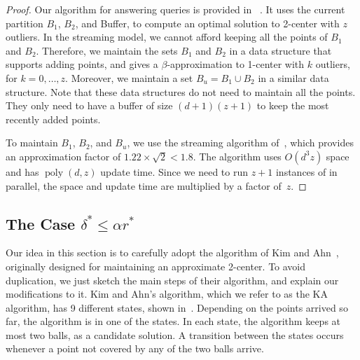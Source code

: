 \documentclass[envcountsame]{cls/cccg15}
\newcommand{\dz}{(d + 1)(z + 1)}
\newcommand{\poly}{\mathop{\mathrm{poly}}}
\newcommand{\lee}{\leqslant}
\renewcommand{\leq}{\lee}
\begin{document}
\begin{proof}
Our algorithm for answering queries is provided in ~.
It uses the current partition $B_1$, $B_2$, and Buffer, to compute
an optimal solution to 2-center with $z$ outliers.
In the streaming model, we cannot afford keeping all the points of $B_1$ and $B_2$. 
Therefore, we maintain the sets $B_1$ and $B_2$ 
in a data structure that supports adding points,
and gives a $\beta$-approximation to 1-center with $k$ outliers, for $k=0,\dots,z$.
Moreover, we maintain a set $B_u = B_1 \cup B_2$ in a similar data structure.
Note that these data structures do not need to maintain all the points. 
They only need to have a buffer of size $\dz$ to keep the most recently added points.

To maintain $B_1$, $B_2$, and $B_u$, we 
use the streaming algorithm of~\cite{zarrabi2009streaming,chan2014streaming},
which provides an approximation factor of $1.22 \times \sqrt{2} <1.8$.
The algorithm uses $O(d^3z)$ space and has $\poly(d,z)$ update time.
Since we need to run $z + 1$ instances of  in parallel, 
the space and update time are multiplied by a factor of~$z$.
\end{proof}



\subsection{The Case $\delta^* \leq \alpha r^*$}
\label{subsec:smaller}

Our idea in this section is to carefully adopt
the algorithm of Kim and Ahn~\cite{kim2014improved},
originally designed for maintaining an approximate 2-center.
To avoid duplication, we just sketch the main steps of their algorithm,
and explain our modifications to it. 
Kim and Ahn's algorithm, which we refer to as the KA algorithm,
has 9 different states, shown in~.
Depending on the points arrived so far, the algorithm is in one of the states.
In each state, the algorithm keeps at most two balls, as a candidate solution. 
A transition between the states occurs whenever a point not covered by any of the two balls arrive. 
\end{document}
